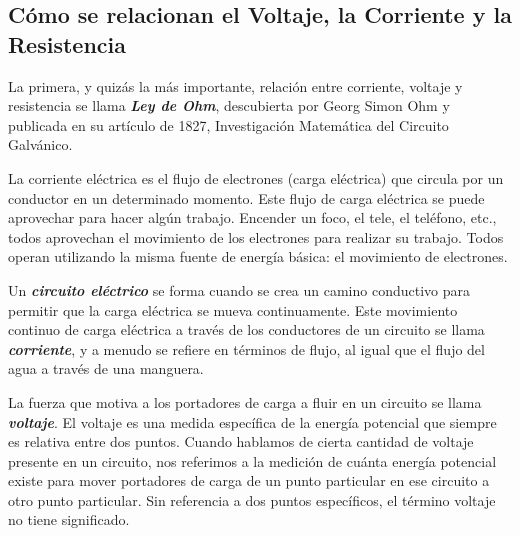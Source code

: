 \documentclass[output=paper, 
colorlinks,
citecolor=brown,
newtxmath
]{langscibook}
\begin{document}
\def\maketitle{

 \makeatletter
 {\color{bl} \centering \huge \sc \textbf{
\large \vspace*{-8pt} \color{black} Voltage, Corriente y Resistencia - Ley de Ohm
 \vspace*{8pt} }\par}
 \makeatother


 \makeatletter
 {\centering \small 
 	\vspace{20pt} }
 \makeatother

}



















\subsection{Cómo se relacionan el Voltaje, la Corriente y la Resistencia}

La primera, y quizás la más importante, relación entre corriente, voltaje y resistencia se llama \textit{\textbf{Ley de Ohm}}, descubierta por Georg Simon Ohm y publicada en su artículo de 1827, Investigación Matemática del Circuito Galvánico.

La corriente eléctrica es el flujo de electrones (carga eléctrica) que circula por un conductor en un determinado momento. Este flujo de carga eléctrica se puede aprovechar para hacer algún trabajo. Encender un foco, el tele, el teléfono, etc., todos aprovechan el movimiento de los electrones para realizar su trabajo. Todos operan utilizando la misma fuente de energía básica: el movimiento de electrones.

Un \textit{\textbf{circuito eléctrico}} se forma cuando se crea un camino conductivo para permitir que la carga eléctrica se mueva continuamente. Este movimiento continuo de carga eléctrica a través de los conductores de un circuito se llama \textit{\textbf{corriente}}, y a menudo se refiere en términos de flujo, al igual que el flujo del agua a través de una manguera.

La fuerza que motiva a los portadores de carga a fluir en un circuito se llama \textit{\textbf{voltaje}}. El voltaje es una medida específica de la energía potencial que siempre es relativa entre dos puntos. Cuando hablamos de cierta cantidad de voltaje presente en un circuito, nos referimos a la medición de cuánta energía potencial existe para mover portadores de carga de un punto particular en ese circuito a otro punto particular. Sin referencia a dos puntos específicos, el término voltaje no tiene significado.
\end{document}
